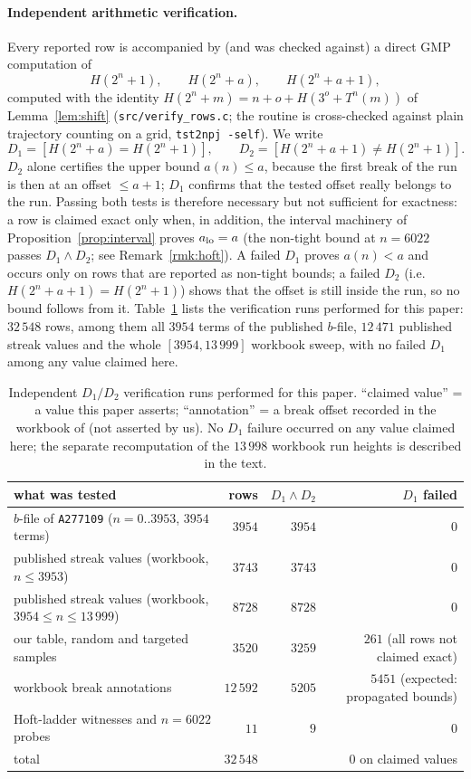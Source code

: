 \documentclass[11pt]{article}
\theoremstyle{remark}
\newcommand{\TT}{T}
\newcommand{\ooo}{o}
\begin{document}
\paragraph{Independent arithmetic verification.} Every reported row is accompanied by (and was checked
against) a direct GMP computation of
\[
H(2^n+1),\qquad H(2^n+a),\qquad H(2^n+a+1),
\]
computed with the identity $H(2^n+m)=n+\ooo+H(3^{\ooo}+\TT^n(m))$ of Lemma~\ref{lem:shift}
(\texttt{src/verify\_rows.c}; the routine is cross-checked against plain trajectory counting on a grid,
\texttt{tst2npj -self}). We write
\[
D_1=[H(2^n+a)=H(2^n+1)],\qquad D_2=[H(2^n+a+1)\ne H(2^n+1)].
\]
$D_2$ alone certifies the upper bound $a(n)\le a$, because the first break of the run is then at an offset
$\le a+1$; $D_1$ confirms that the tested offset really belongs to the run. Passing both tests is therefore
necessary but not sufficient for exactness: a row is claimed exact only when, in addition, the interval
machinery of Proposition~\ref{prop:interval} proves $a_{\rm lo}=a$ (the non-tight bound at $n=6022$ passes
$D_1\wedge D_2$; see Remark~\ref{rmk:hoft}). A failed $D_1$ proves $a(n)<a$ and occurs only on rows that are
reported as non-tight bounds; a failed $D_2$ (i.e.\ $H(2^n+a+1)=H(2^n+1)$) shows that the offset is still
inside the run, so no bound follows from it. Table~\ref{tab:verif} lists the verification runs performed
for this paper: $32\,548$ rows, among them all $3954$ terms of the published $b$-file, $12\,471$
published streak values and the whole $[3954,13\,999]$ workbook sweep, with no failed $D_1$ among any
value claimed here.

\begin{table}[ht]
\centering
\small
\caption{Independent $D_1/D_2$ verification runs performed for this paper. ``claimed value'' = a value
this paper asserts; ``annotation'' = a break offset recorded in the workbook of \cite{frinkle2025}
(not asserted by us). No $D_1$ failure occurred on any value claimed here; the separate recomputation of
the $13\,998$ workbook run heights is described in the text.}
\label{tab:verif}
\begin{tabular}{lrrr}
\toprule
what was tested & rows & $D_1\wedge D_2$ & $D_1$ failed \\
\midrule
$b$-file of \texttt{A277109} ($n=0..3953$, $3954$ terms) & $3954$ & $3954$ & $0$\\
published streak values (workbook, $n\le3953$) & $3743$ & $3743$ & $0$\\
published streak values (workbook, $3954\le n\le13\,999$) & $8728$ & $8728$ & $0$\\
our table, random and targeted samples & $3520$ & $3259$ & $261$ (all rows not claimed exact)\\
workbook break annotations & $12\,592$ & $5205$ & $5451$ (expected: propagated bounds)\\
Hoft-ladder witnesses and $n=6022$ probes & $11$ & $9$ & $0$\\
\midrule
total & $32\,548$ & & $0$ on claimed values\\
\bottomrule
\end{tabular}
\end{table}
\end{document}
